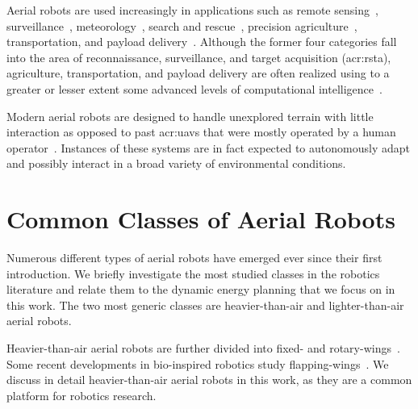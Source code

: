 Aerial robots are used increasingly in applications such as remote sensing~\citep{noor2018remote,tang2015drone,milas2018drones}, surveillance~\citep{paucar2018use,burkle2009collaborating}, meteorology~\citep{schuyler2019using}, search and rescue~\citep{pensieri2020drones,karaca2018potential,cui2015drones,seguin2018unmanned}, precision agriculture~\citep{daponte2019review,puri2017agriculture}, transportation, and payload delivery~\citep{kellermann2020drones}. Although the former four categories fall into the area of reconnaissance, surveillance, and target acquisition (\Gls{acr:rsta}), agriculture, transportation, and payload delivery are often realized using to a greater or lesser extent some advanced levels of computational intelligence~\citep{siciliano2016springer}. 

Modern aerial robots are designed to handle unexplored terrain with little interaction as opposed to past \Gls{acr:uav}s that were mostly operated by a human operator~\citep{siciliano2016springer}. Instances of these systems are in fact expected to autonomously adapt and possibly interact in a broad variety of environmental conditions.



\section{Common Classes of Aerial Robots}

Numerous different types of aerial robots have emerged ever since their first introduction. We briefly investigate the most studied classes in the robotics literature and relate them to the dynamic energy planning that we focus on in this work. The two most generic classes are heavier-than-air and lighter-than-air aerial robots.

Heavier-than-air aerial robots are further divided into fixed- and rotary-wings~\citep{siciliano2016springer}. Some recent developments in bio-inspired robotics study flapping-wings~\citep{floreano2015science}. We discuss in detail heavier-than-air aerial robots in this work, as they are a common platform for robotics research. 

